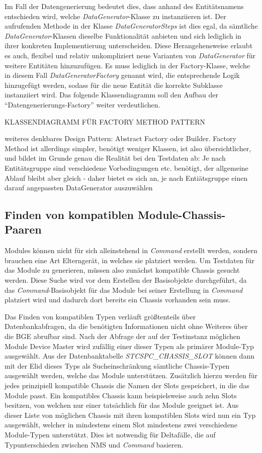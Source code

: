 Im Fall der Datengenerierung bedeutet dies, dass anhand des Entitätsnamens entschieden wird, welche \textit{DataGenerator}-Klasse zu instanziieren ist. Der aufrufenden Methode in der Klasse \textit{DataGeneratorSteps} ist dies egal, da sämtliche \textit{DataGenerator}-Klassen dieselbe Funktionalität anbieten und sich lediglich in ihrer konkreten Implementierung unterscheiden. Diese Herangehensweise erlaubt es auch, flexibel und relativ unkompliziert neue Varianten von \textit{DataGenerator} für weitere Entitäten hinzuzufügen. Es muss lediglich in der Factory-Klasse, welche in diesem Fall \textit{DataGeneratorFactory} genannt wird, die entsprechende Logik hinzugefügt werden, sodass für die neue Entität die korrekte Subklasse instanziiert wird. Das folgende Klassendiagramm soll den Aufbau der \enquote{Datengenerierungs-Factory} weiter verdeutlichen.

KLASSENDIAGRAMM FÜR FACTORY METHOD PATTERN

weiteres denkbares Design Pattern: Abstract Factory oder Builder. Factory Method ist allerdings simpler, benötigt weniger Klassen, ist also übersichtlicher, und bildet im Grunde genau die Realität bei den Testdaten ab: Je nach Entitätsgruppe sind verschiedene Vorbedingungen etc. benötigt, der allgemeine Ablauf bleibt aber gleich - daher bietet es sich an, je nach Entiätsgruppe einen darauf angepassten DataGenerator auszuwählen

\subsection{Finden von kompatiblen Module-Chassis-Paaren}\label{subsec:findCompatibleTypes}
Modules können nicht für sich alleinstehend in \textit{Command} erstellt werden, sondern brauchen eine Art Elterngerät, in welches sie platziert werden. Um Testdaten für das Module zu generieren, müssen also zunächst kompatible Chassis gesucht werden. Diese Suche wird vor dem Erstellen der Basisobjekte durchgeführt, da das \textit{Command}-Basisobjekt für das Module bei seiner Erstellung in \textit{Command} platziert wird und dadurch dort bereits ein Chassis vorhanden sein muss.

Das Finden von kompatiblen Typen verläuft größtenteils über Datenbankabfragen, da die benötigten Informationen nicht ohne Weiteres über die \ac{BGE} abrufbar sind. Nach der Abfrage der auf der Testinstanz möglichen Module Device Master wird zufällig einer dieser Typen als primärer Module-Typ ausgewählt. Aus der Datenbanktabelle \textit{STCSPC\_CHASSIS\_SLOT} können dann mit der \ac{Elid} dieses Typs als Sucheinschränkung sämtliche Chassis-Typen ausgewählt werden, welche das Module unterstützen. Zusätzlich hierzu werden für jedes prinzipiell kompatible Chassis die Namen der Slots gespeichert, in die das Module passt. Ein kompatibles Chassis kann beispielsweise auch zehn Slots besitzen, von welchen nur einer tatsächlich für das Module geeignet ist. Aus dieser Liste von möglichen Chassis mit ihren kompatiblen Slots wird nun ein Typ ausgewählt, welcher in mindestens einem Slot mindestens zwei verschiedene Module-Typen unterstützt. Dies ist notwendig für Deltafälle, die auf Typunterschieden zwischen \ac{NMS} und \textit{Command} basieren.

